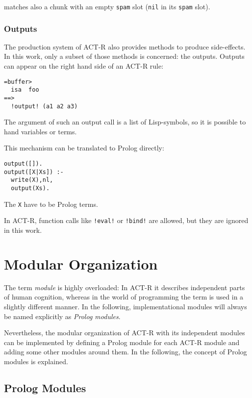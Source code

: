 matches also a chunk with an empty \verb|spam| slot (\verb|nil| in its \verb|spam| slot).



\subsubsection{Outputs}

The production system of ACT-R also provides methods to produce side-effects. In this work, only a subset of those methods is concerned: the outputs. Outputs can appear on the right hand side of an ACT-R rule:

\begin{lstlisting}
=buffer>
  isa  foo
==>
  !output! (a1 a2 a3)
\end{lstlisting}

The argument of such an output call is a list of Lisp-symbols, so it is possible to hand variables or terms.

This mechanism can be translated to Prolog directly:

\begin{lstlisting}
output([]).
output([X|Xs]) :-
  write(X),nl,
  output(Xs).
\end{lstlisting}

The \verb|X| have to be Prolog terms.

In ACT-R, function calls like \verb|!eval!| or \verb|!bind!| are allowed, but they are ignored in this work.

\section{Modular Organization}

The term \emph{module} is highly overloaded: In ACT-R it describes independent parts of human cognition, whereas in the world of programming the term is used in a slightly different manner. In the following, implementational modules will always be named explicitly as \emph{Prolog modules}.

Nevertheless, the modular organization of ACT-R with its independent modules can be implemented by defining a Prolog module for each ACT-R module and adding some other modules around them. In the following, the concept of Prolog modules is explained.

\subsection{Prolog Modules}

